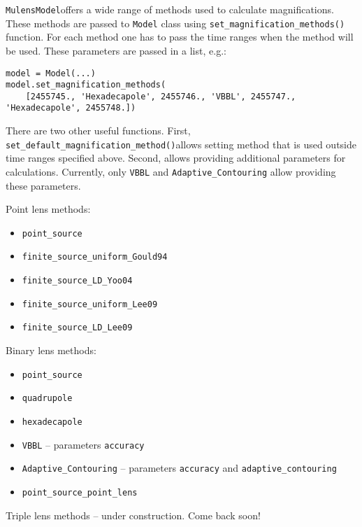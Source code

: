 \documentclass[12pt]{article}
\newcommand\MM{{\tt MulensModel}}
\begin{document}

\MM offers a wide range of methods used to calculate magnifications. 
These methods are passed to {\tt Model} class using 
{\tt set\_magnification\_methods()} function.  For each method one has to 
pass the time ranges when the method will be used.  These parameters are 
passed in a list, e.g.:

\begin{verbatim}
model = Model(...)
model.set_magnification_methods(
    [2455745., 'Hexadecapole', 2455746., 'VBBL', 2455747., 'Hexadecapole', 2455748.])
\end{verbatim}

There are two other useful functions. 
First, {\tt set\_default\_magnification\_method()}\linebreak allows setting method that 
is used outside time ranges specified above.  
Second,  allows 
providing additional parameters for calculations.  Currently, only 
{\tt VBBL} and {\tt Adaptive\_Contouring} allow providing these parameters. 

\bigskip\bigskip
Point lens methods:
\begin{itemize}
\item {\tt point\_source}
\item {\tt finite\_source\_uniform\_Gould94}
\item {\tt finite\_source\_LD\_Yoo04}
\item {\tt finite\_source\_uniform\_Lee09}
\item {\tt finite\_source\_LD\_Lee09}
\end{itemize}

\bigskip\bigskip
Binary lens methods:
\begin{itemize}
\item {\tt point\_source}
\item {\tt quadrupole}
\item {\tt hexadecapole}
\item {\tt VBBL} -- parameters {\tt accuracy}
\item {\tt Adaptive\_Contouring} -- parameters {\tt accuracy} and {\tt adaptive\_contouring}
\item {\tt point\_source\_point\_lens}
\end{itemize}

\bigskip\bigskip
Triple lens methods -- under construction.  Come back soon!
\end{document}
